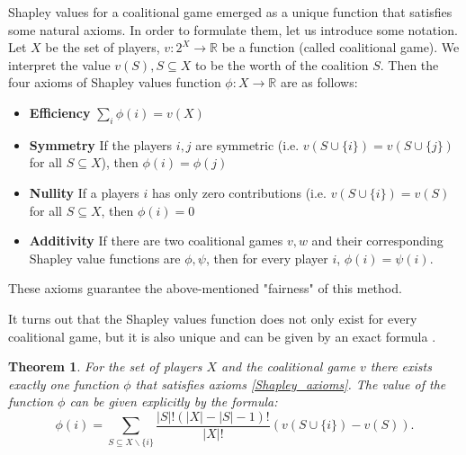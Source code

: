 \documentclass[magisterska,en]{pracamgr}
\newtheorem{thm}{Theorem}[section]
\begin{document}
Shapley values for a coalitional game emerged as a unique function that satisfies some natural axioms. In order to formulate them, let us introduce some notation.  Let $X$ be the set of players, $v: 2^X \rightarrow \mathbb{R}$ be a function (called coalitional game). We interpret the value $v(S), S \subseteq X$ to be the worth of the coalition $S$. Then the four axioms of Shapley values function $\phi:X  \rightarrow \mathbb{R}$ are as follows:
\begin{itemize}
\item \textbf{Efficiency}  $\sum_i  \phi(i) = v(X)$
\item \textbf{Symmetry} If the players $i, j$ are symmetric (i.e. $v(S\cup \{i\}) = v(S \cup \{j\})$ for all $S \subseteq X$), then $\phi(i) = \phi(j)$
\item \textbf{Nullity} If a players $i$ has only zero contributions (i.e. $v(S\cup \{i\}) = v(S)$ for all $S \subseteq X$, then $\phi(i) = 0$
\item \textbf{Additivity} If there are two coalitional games $v, w$ and their corresponding Shapley value functions are $\phi, \psi$, then for every player $i$, $\phi(i) = \psi(i)$.
\label{Shapley_axioms}
\end{itemize}
These axioms guarantee the above-mentioned "fairness" of this method.

It turns out that the Shapley values function does not only exist for every coalitional game, but it is also unique and can be given by an exact formula \cite{ShapleyValues}.

\begin{thm}\label{shap_def}
  For the set of players $X$ and the coalitional game $v$ there exists exactly one function $\phi$ that satisfies axioms \ref{Shapley_axioms}.
The value of the function $\phi$ can be given explicitly by the formula:
  \begin{equation*}
      \phi (i) = \sum_{S\subseteq X\backslash \{i\}} \frac{|S|!(|X|-|S|-1)!}{|X|!}\left(v(S \cup \{i\}) - v(S)\right).
  \end{equation*}
\end{thm}
\end{document}
